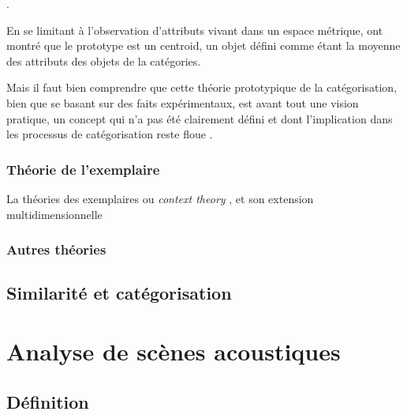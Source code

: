 . 

En se limitant à l'observation d'attributs vivant dans un espace métrique, \citep{reed1972pattern, rosch1976structural} ont montré que le prototype est un centroid, un objet défini comme étant la moyenne des attributs des objets de la catégories.

Mais il faut bien comprendre que cette théorie prototypique de la catégorisation, bien que se basant sur des faits expérimentaux, est avant tout une vision pratique, un concept qui n'a pas été clairement défini et dont l'implication dans les processus de catégorisation reste floue \citep[p. 36-40]{rosch1978cognition} \citep[p. 49-54]{dubois1991semantique}.

\subsubsection{Théorie de l'exemplaire}

La théories des exemplaires ou \textit{context theory} \citep{medin1978context}, et son extension multidimensionnelle \citep{medin1978context}

\subsubsection{Autres théories}

\subsection{Similarité et catégorisation}

\section{Analyse de scènes acoustiques}
\label{sec:ASA}

\subsection{Définition}
\label{sec:ASAintro}

